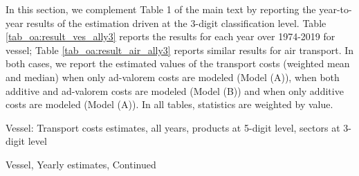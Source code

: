 \documentclass[11pt,twoside, authoryear]{elsarticle}
\begin{document}
In this section, we complement Table 1 of the main text by reporting the year-to-year results of the estimation driven at the 3-digit classification level. Table \ref{tab_oa:result_ves_ally3} reports the results for each year over 1974-2019 for vessel; Table \ref{tab_oa:result_air_ally3} reports similar results for air transport. In both cases, we report the estimated values of the transport costs (weighted mean and median) when only ad-valorem costs are modeled (Model (A)), when both additive and ad-valorem costs are modeled (Model (B)) and when only additive costs are modeled (Model (A)). In all tables, statistics are weighted by value.

\begin{landscape}

\begin{table}[htbp]

	\caption{Vessel: Transport costs estimates, all years, products at 5-digit level, sectors at 3-digit level}
	\begin{center}
		
		

	\end{center}
\label{tab_oa:result_ves_ally3}%
\end{table}%

\setcounter{table}{0}

\begin{table}[htbp]
	
	\caption{Vessel, Yearly estimates, Continued}
	\begin{center}
		
		
		

\end{center}
\end{table}
\end{landscape}
\end{document}
